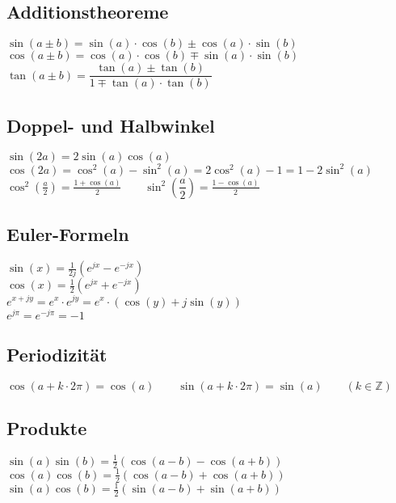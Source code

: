 \begin{minipage}{0.5\textwidth}
\subsection{Additionstheoreme}
	$\sin(a \pm b)=\sin(a) \cdot \cos(b) \pm \cos(a) \cdot \sin(b)$\\
	$\cos(a \pm b)=\cos(a) \cdot \cos(b) \mp \sin(a) \cdot \sin(b)$\\	
	$\tan(a \pm b)=\dfrac{\tan(a) \pm \tan(b)}{1 \mp \tan(a) \cdot \tan(b)}$
\end{minipage}
%
\begin{minipage}{0.5\textwidth}
\subsection{Doppel- und Halbwinkel}	
	$\sin(2a)=2\sin(a)\cos(a)$\\
	$\cos(2a)=\cos^2(a)-\sin^2(a)=2\cos^2(a)-1=1-2\sin^2(a)$\\
	$\cos^2 \left(\frac{a}{2}\right)=\frac{1+\cos(a)}{2} \qquad
	\sin^2 \left(\dfrac{a}{2}\right)=\frac{1-\cos(a)}{2}$
\end{minipage}
%

\subsection{Euler-Formeln} 
	$\sin(x) = \frac{1}{2j} \left(e^{jx} - e^{-jx}\right)$ \\
	$\cos(x) = \frac{1}{2} \left(e^{jx} + e^{-jx}\right)$ \\
	$e^{x+jy} = e^x \cdot e^{jy} = e^x \cdot \left(\cos(y) + j\sin(y)\right)$ \\
	$e^{j\pi} = e^{-j\pi} = -1$ \\

\subsection{Periodizität}
	$\cos(a+k\cdot2\pi)=\cos(a) \qquad \sin(a+k\cdot2\pi)=\sin(a) \qquad
	(k \in \mathbb{Z})$

\subsection{Produkte}
	$\sin(a)\sin(b)=\frac{1}{2}(\cos(a-b)-\cos(a+b))$\\
	$\cos(a)\cos(b)=\frac{1}{2}(\cos(a-b)+\cos(a+b))$\\
	$\sin(a)\cos(b)=\frac{1}{2}(\sin(a-b)+\sin(a+b))$\\

